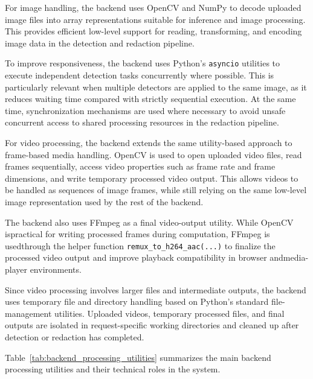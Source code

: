 
For image handling, the backend uses OpenCV and NumPy to decode uploaded image files into array representations suitable for \gls{inference} and image processing. This provides efficient low-level support for reading, transforming, and encoding image data in the detection and redaction pipeline.

To improve responsiveness, the backend uses Python's \texttt{asyncio} utilities to execute independent detection tasks concurrently where possible. This is particularly relevant when multiple detectors are applied to the same image, as it reduces waiting time compared with strictly sequential execution. At the same time, synchronization mechanisms are used where necessary to avoid unsafe concurrent access to shared processing resources in the redaction pipeline.

For video processing, the backend extends the same utility-based approach to frame-based media handling. OpenCV is used to open uploaded video files, read frames sequentially, access video properties such as frame rate and frame dimensions, and write temporary processed video output. This allows videos to be handled as sequences of image frames, while still relying on the same low-level image representation used by the rest of the backend.

The backend also uses FFmpeg as a final video-output utility. While OpenCV ispractical for writing processed frames during computation, FFmpeg is usedthrough the helper function \texttt{remux\_to\_h264\_aac(...)} to finalize the processed video output and improve playback compatibility in browser andmedia-player environments.

Since video processing involves larger files and intermediate outputs, the backend uses temporary file and directory handling based on Python’s standard file-management utilities. Uploaded videos, temporary processed files, and final outputs are isolated in request-specific working directories and cleaned up after detection or redaction has completed. 

Table~\ref{tab:backend_processing_utilities} summarizes the main backend processing utilities and their technical roles in the system.

